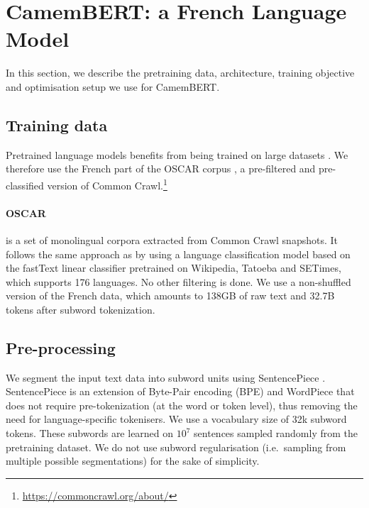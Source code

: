 \documentclass[11pt,a4paper]{article}
\newcommand{\camembert}{CamemBERT\xspace}
\begin{document}
\section{\camembert: a French Language Model}\label{sec:Camembert}
In this section, we describe the pretraining data, architecture, training objective and optimisation setup we use for \camembert.


\subsection{Training data}
Pretrained language models benefits from being trained on large datasets \cite{devlin2018mbert,liu2019roberta,raffel2019exploring}. We therefore use the French part of the OSCAR corpus \cite{ortiz2019asynchronous}, a pre-filtered and pre-classified version of Common Crawl.\footnote{\url{https://commoncrawl.org/about/}} 

\paragraph{OSCAR} is a set of monolingual corpora extracted from Common Crawl snapshots\iffalse, specifically from the plain text \emph{WET} format distributed by Common Crawl which removes all the HTML tags and converts the text formatting to UTF-8\fi{}. It follows the same approach as \cite{grave2018learning} by using a language classification model based on the fastText linear classifier \cite{grave2017bag,joulin2016fasttext} pretrained on Wikipedia, Tatoeba and SETimes, which supports 176 languages. No other filtering is done. We use a non-shuffled version of the French data, which amounts to 138GB of raw text and 32.7B tokens after subword tokenization.











\subsection{Pre-processing}
We segment the input text data into subword units using SentencePiece \cite{kudo2018sentencepiece}.
SentencePiece is an extension of Byte-Pair encoding (BPE) \cite{sennrich2016neural} and WordPiece \cite{kudo2018subword} that does not require pre-tokenization (at the word or token level), thus removing the need for language-specific tokenisers.
We use a vocabulary size of 32k subword tokens. These subwords are learned on $10^7$ sentences sampled randomly from the pretraining dataset.
We do not use subword regularisation (i.e.~sampling from multiple possible segmentations) for the sake of simplicity.
\end{document}
